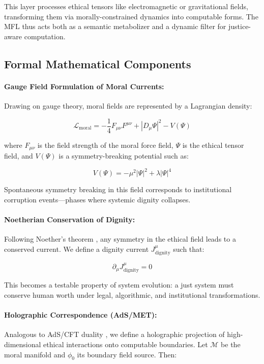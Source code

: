 \documentclass{article}
\theoremstyle{plain}
\theoremstyle{claimstyle}
\begin{document}
This layer processes ethical tensors like electromagnetic or gravitational fields, transforming them via morally-constrained dynamics into computable forms. The MFL thus acts both as a semantic metabolizer and a dynamic filter for justice-aware computation.

\subsection{Formal Mathematical Components}

\paragraph{Gauge Field Formulation of Moral Currents:}

Drawing on gauge theory, moral fields are represented by a Lagrangian density:

\[
\mathcal{L}_{\text{moral}} = -\frac{1}{4}F_{\mu\nu}F^{\mu\nu} + |D_\mu\Psi|^2 - V(\Psi)
\]

where \(F_{\mu\nu}\) is the field strength of the moral force field, \(\Psi\) is the ethical tensor field, and \(V(\Psi)\) is a symmetry-breaking potential such as:

\[
V(\Psi) = -\mu^2|\Psi|^2 + \lambda|\Psi|^4
\]

Spontaneous symmetry breaking in this field corresponds to institutional corruption events—phases where systemic dignity collapses.

\paragraph{Noetherian Conservation of Dignity:}

Following Noether’s theorem \citep{Noether1918}, any symmetry in the ethical field leads to a conserved current. We define a dignity current \(J^\mu_{\text{dignity}}\) such that:

\[
\partial_\mu J^\mu_{\text{dignity}} = 0
\]

This becomes a testable property of system evolution: a just system must conserve human worth under legal, algorithmic, and institutional transformations.

\paragraph{Holographic Correspondence (AdS/MET):}

Analogous to AdS/CFT duality \citep{Maldacena1998}, we define a holographic projection of high-dimensional ethical interactions onto computable boundaries. Let \(\mathcal{M}\) be the moral manifold and \(\phi_0\) its boundary field source. Then:
\end{document}
